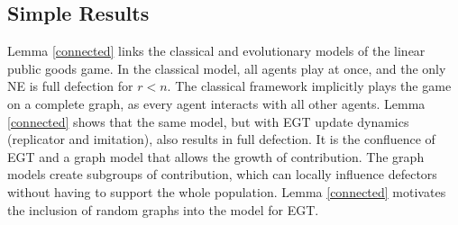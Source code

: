  \subsection{Simple Results} \label{Simple}

 Lemma \ref{connected} links the classical and evolutionary models of the linear public goods game. In the classical model, all agents play at once, and the only NE is full defection for $r<n$. The classical framework implicitly plays the game on a complete graph, as every agent interacts with all other agents. Lemma \ref{connected} shows that the same model, but with EGT update dynamics (replicator and imitation), also results in full defection. It is the confluence of EGT and a graph model that allows the growth of contribution. The graph models create subgroups of contribution, which can locally influence defectors without having to support the whole population. Lemma \ref{connected} motivates the inclusion of random graphs into the model for EGT.

